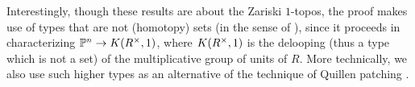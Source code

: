 Interestingly, though these results are
about the Zariski $1$-topos, the proof makes use of types that
are not (homotopy) sets (in the sense of \cite{hott}),
since it proceeds in characterizing $\mathbb{P}^n\rightarrow K(R^{\times},1)$, where $K(R^{\times},1)$ is the delooping
(thus a type which is not a set) of the multiplicative group of units of $R$.
More technically, we also use such higher types as an alternative of the technique
of Quillen patching \cite{Quillen,lombardi-quitte,lam}.













